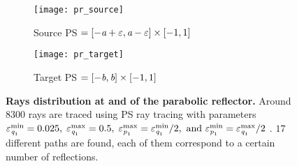 \begin{figure}[h]
 \begin{subfigure}[h]{0.47\textwidth}
\centering
    \texttt{[image: pr\_source]}
    \caption{Source PS  $= [-\textit{a}+\varepsilon,\textit{a}-\varepsilon]\times[-1,1]$}
    \label{fig:source_triang_pr}
\end{subfigure}
\hfill
\begin{subfigure}[h]{0.47\textwidth}
\centering
    \texttt{[image: pr\_target]}
    \caption{Target PS  $= [-\textit{b},\textit{b}]\times[-1,1]$}
    \label{fig:target_triang_pr}
\end{subfigure}
\caption{\textbf{Rays distribution at  and  of the parabolic reflector.} Around $8300$ rays are traced using PS ray tracing with parameters $\varepsilon_{\textit{q}_1}^{\textrm{min}} = 0.025, \; \varepsilon_{\textit{q}_1}^{\textrm{max}} = 0.5, \; \varepsilon_{\textit{p}_1}^{\textrm{max}} = \varepsilon_{\textit{q}_1}^{\textrm{min}}/2, \mbox{ and }  \varepsilon_{\textit{p}_1}^{\textrm{min}} = \varepsilon_{\textit{q}_1}^{\textrm{max}}/2$ . $17$ different paths are found, each of them correspond to a certain number of reflections.}
 \label{fig:phase_space_pr}

\end{figure}
